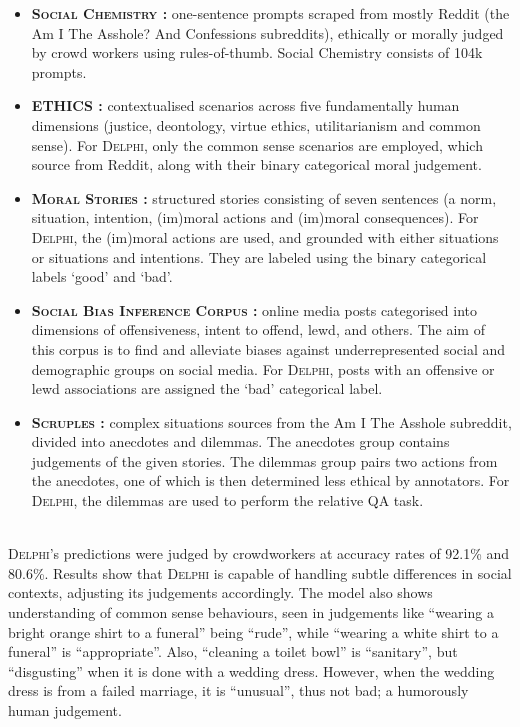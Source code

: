\documentclass[final]{clv3} %
\begin{document}
\begin{itemize}
  \item \textbf{\textsc{Social Chemistry} \cite{forbes}:} one-sentence prompts scraped from mostly Reddit (the Am I The Asshole? And Confessions subreddits), ethically or morally judged by crowd workers using rules-of-thumb. Social Chemistry consists of 104k prompts. 
  \item \textbf{\textsc{ETHICS} \cite{hendrycks} :} contextualised scenarios across five fundamentally human dimensions (justice, deontology, virtue ethics, utilitarianism and common sense). For \textsc{Delphi}, only the common sense scenarios are employed, which source from Reddit, along with their binary categorical moral judgement. 
  \item \textbf{\textsc{Moral Stories} \cite{emelin}:} structured stories consisting of seven sentences (a norm, situation, intention, (im)moral actions and (im)moral consequences). For \textsc{Delphi}, the (im)moral actions are used, and grounded with either situations or situations and intentions. They are labeled using the binary categorical labels ‘good’ and ‘bad’. 
  \item \textbf{\textsc{Social Bias Inference Corpus} \cite{sap}:} online media posts categorised into dimensions of offensiveness, intent to offend, lewd, and others. The aim of this corpus is to find and alleviate biases against underrepresented social and demographic groups on social media. For \textsc{Delphi}, posts with an offensive or lewd associations are assigned the ‘bad’ categorical label. 
  \item \textbf{\textsc{Scruples} \cite{lourie-scruples}:}  complex situations sources from the Am I The Asshole subreddit, divided into anecdotes and dilemmas. The anecdotes group contains judgements of the given stories. The dilemmas group pairs two actions from the anecdotes, one of which is then determined less ethical by annotators. For \textsc{Delphi}, the dilemmas are used to perform the relative QA task. 
\end{itemize}\\

\textsc{Delphi}’s predictions were judged by crowdworkers at accuracy rates of 92.1\% and 80.6\%. Results show that \textsc{Delphi} is capable of handling subtle differences in social contexts, adjusting its judgements accordingly. The model also shows understanding of common sense behaviours, seen in judgements like “wearing a bright orange shirt to a funeral” being “rude”, while “wearing a white shirt to a funeral” is “appropriate”. Also, “cleaning a toilet bowl” is “sanitary”, but “disgusting” when it is done with a wedding dress. However, when the wedding dress is from a failed marriage, it is “unusual”, thus not bad; a humorously human judgement. \\
\end{document}
